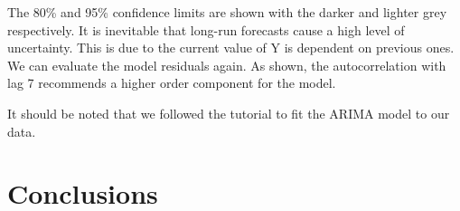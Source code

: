 \documentclass{article}
\begin{document}
The 80\% and 95\% confidence limits are shown with the darker and lighter grey respectively. It is inevitable that long-run forecasts cause a high level of uncertainty. This is due to the current value of Y is dependent on previous ones.
We can evaluate the model residuals again. As shown, the autocorrelation with lag 7 recommends a higher order component for the model.

It should be noted that we followed the tutorial to fit the ARIMA model to our data. 

\section{Conclusions}

\printbibliography
\end{document}
